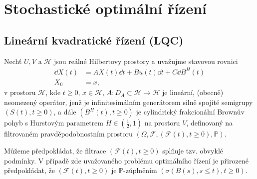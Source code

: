 
\chapter{Stochastické optimální řízení}



\section{Lineární kvadratické řízení (LQC)}
    \cite{duncan2012linear}
    Nechť $U,V$ a $\mathscr{H}$ jsou reálné Hilbertovy prostory a uvažujme
    stavovou rovnici
    \begin{align}
        \dd X(t) &= A X(t)\dd t + B u(t)\dd t + C \dd B^H(t)
        \label{eq:stateeq}\\
        X_0 &= x,\nonumber
    \end{align}
    v prostoru $\mathscr{H}$, kde $t\geq0$, $x\in\mathscr{H}$, $A : D_A \subset
    \mathscr{H}\rightarrow\mathscr{H}$ je lineární, (obecně) neomezený
    operátor, jenž je infinitesimálním generátorem silně spojité semigrupy
    $\left(S(t),t\geq0\right)$, a dále $\left(B^H(t),t\geq0\right)$ je
    cylindrický frakcionální Brownův pohyb s Hurstovým parametrem 
    $H\in\left({\frac{1}{2},1}\right)$ na prostoru $V$, definovaný na
    filtrovaném pravděpodobnostním prostoru $\left( \Omega, \mathscr{F}, \left(
    \mathscr{F}(t),t\geq0\right),\mathbb{P} \right).$
    
    Můžeme předpokládat, že filtrace $\left( \mathscr{F}(t),
    t\geq0 \right)$ splňuje tzv. obvyklé podmínky. V případě zde uvažovaného
    problému optimálního řízení je přirozené předpokládat, že $\left( \mathscr{F}(t),
    t\geq0 \right)$ je $\mathbb{P}$-zúplněním $\left( \sigma \left( B(s), s\leq
    t \right),t\geq0 \right)$.
\\

